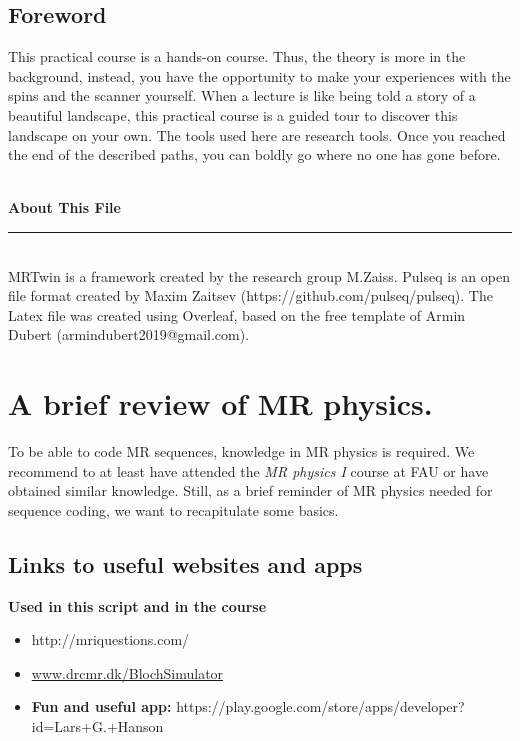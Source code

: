 \documentclass[a4paper,12pt]{extarticle}
\begin{document}
\subsection*{Foreword}
This practical course is a hands-on course. Thus, the theory is more in the background, instead, you have the opportunity to make your experiences with the spins and the scanner yourself. When a lecture is like being told a story of a beautiful landscape, this practical course is a guided tour to discover this landscape on your own. The tools used here are research tools. Once you reached the end of the described paths, you can boldly go where no one has gone before.
\\
\\
\small{\noindent \textbf{About This File} \vspace{-3mm}\\
\noindent \rule{3.3cm}{0.5pt} \\
 MRTwin is a framework created by the research group M.Zaiss. Pulseq is an open file format created by Maxim Zaitsev (https://github.com/pulseq/pulseq). 
The Latex file was created using Overleaf, based on the free template of Armin Dubert (armindubert2019@gmail.com).}
\newpage
{}


\newpage
\section{A brief review of MR physics. }
\vspace{7.5cm}
 To be able to code MR sequences, knowledge in MR physics is required. We recommend to at least have attended the \emph{MR physics I} course at FAU or have obtained similar knowledge. Still, as a brief reminder of MR physics needed for sequence coding, we want to recapitulate some basics. 
 
\subsection{Links to useful websites and apps}
\textbf{Used in this script and in the course}
\begin{itemize}
\item http://mriquestions.com/
\item \href{http://www.drcmr.dk/BlochSimulator/}{www.drcmr.dk/BlochSimulator}
\item \textbf{Fun and useful app:} https://play.google.com/store/apps/developer?id=Lars+G.+Hanson
\end{itemize}
\end{document}
